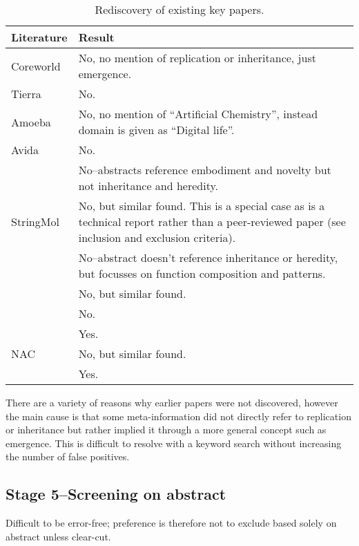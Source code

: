 \begin{table*}
\footnotesize
\begin{center}
\begin{tabular}{@{}lp{6cm}@{}}
\toprule	
Literature & Result \\
\midrule
Coreworld \cite{Rasmussen1990} & No, no mention of replication or inheritance, just emergence.\\
Tierra \cite{Ray1991} & No.\\
Amoeba \cite{Pargellis2001} & No, no mention of ``Artificial Chemistry'', instead domain is given as ``Digital life''.\\
Avida \cite{Ofria2004} & No.\\
\cite{Nellis2012}\cite{Nellis2014} & No--abstracts reference embodiment and novelty but not inheritance and heredity.\\
StringMol \cite{Hickinbotham2012} & No, but similar found. This is a special case as  \cite{Hickinbotham2012} is a technical report rather than a peer-reviewed paper (see inclusion and exclusion criteria).\\
\cite{Fontana1992}	& No--abstract doesn't reference inheritance or heredity, but focusses on function composition and patterns.\\
\cite{Dittrich1998}	& No, but similar found.	\\
\cite{Nowostawski2005} & No.\\
\cite{Fenizio2000}\cite{Fenizio2001} & Yes.	\\		
NAC \cite{Suzuki2006}    & No, but similar found.\\
\cite{Gardiner2007}  & Yes.\\
\bottomrule
\end{tabular}
\end{center}
\caption{Rediscovery of existing key papers.}
\end{table*}

There are a variety of reasons why earlier papers were not discovered, however the main cause is that some meta-information did not directly refer to replication or inheritance but rather implied it through a more general concept such as emergence. This is difficult to resolve with a keyword search without increasing the number of false positives.

\subsection{Stage 5--Screening on abstract}
Difficult to be error-free; preference is therefore not to exclude based solely on abstract unless clear-cut.

